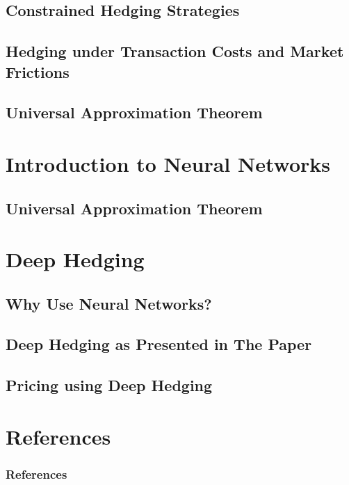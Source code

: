 \documentclass[serif]{beamer}
\begin{document}
\subsection{Constrained Hedging Strategies}
\subsection{Hedging under Transaction Costs and Market Frictions}
\subsection{Universal Approximation Theorem}

\section{Introduction to Neural Networks}
\subsection{Universal Approximation Theorem}

\section{Deep Hedging}

\subsection{Why Use Neural Networks?}
\subsection{Deep Hedging as Presented in The Paper}
\subsection{Pricing using Deep Hedging}

\section{References}
\begin{frame}
    \frametitle{References}
    
    
\end{frame}
\end{document}
